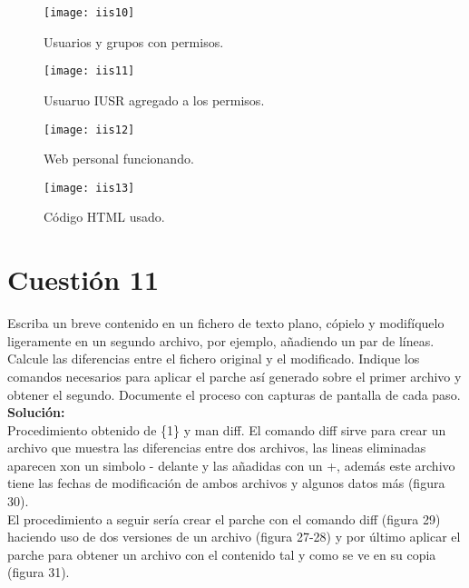 \documentclass[a4paper, 11pt]{article} %
\begin{document}
\begin{figure}[h]
\centering 
\texttt{[image: iis10]} 
\caption{Usuarios y grupos con permisos.} 
\vspace{-0.5cm}
\label{contexto:figura} 
\end{figure}
\begin{figure}[h]
\centering 
\texttt{[image: iis11]} 
\caption{Usuaruo IUSR agregado a los permisos.} 
\vspace{-0.5cm}
\label{contexto:figura} 
\end{figure}
\begin{figure}[h]
\centering 
\texttt{[image: iis12]} 
\caption{Web personal funcionando.} 
\vspace{-0.5cm}
\label{contexto:figura} 
\end{figure}
\begin{figure}[h]
\centering 
\texttt{[image: iis13]} 
\caption{Código HTML usado.} 
\vspace{-0.5cm}
\label{contexto:figura} 
\end{figure}
\section{Cuestión 11}
Escriba un breve contenido en un fichero de texto plano, cópielo y modifíquelo ligeramente en un segundo archivo, por ejemplo, añadiendo un par de líneas. Calcule las diferencias entre el fichero original y el modificado. Indique los comandos necesarios para aplicar el parche así generado sobre el primer archivo y obtener el segundo. Documente el proceso con capturas de pantalla de cada paso.\\
\textbf{Solución:}\\
Procedimiento obtenido de \{1\} y man diff.
El comando diff sirve para crear un archivo que muestra las diferencias entre dos archivos, las lineas eliminadas aparecen xon un simbolo - delante y las añadidas con un +, además este archivo tiene las fechas de modificación de ambos archivos y algunos datos más (figura 30).\\
El procedimiento a seguir sería crear el parche con el comando diff (figura 29) haciendo uso de dos versiones de un archivo (figura 27-28) y por último aplicar el parche para obtener un archivo con el contenido tal y como se ve en su copia (figura 31). 
\end{document}

